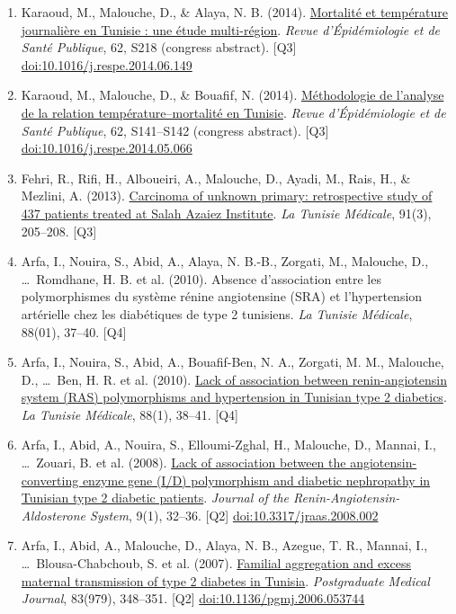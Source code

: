 \documentclass[10pt,a4paper]{article}
\newcommand{\doi}[1]{\href{https://doi.org/#1}{doi:#1}}
\newcommand{\Qu}[1]{[Q#1]}
\begin{document}
\begin{enumerate}[resume*]
\item Karaoud, M., Malouche, D., \& Alaya, N. B. (2014). \href{https://www.em-consulte.com/article/915651/article/mortalite-et-temperature-journaliere-en-tunisie\%C2\%A0-u}{Mortalit\'e et temp\'erature journali\`ere en Tunisie : une \'etude multi-r\'egion}. \emph{Revue d'\'Epid\'emiologie et de Sant\'e Publique}, 62, S218 (congress abstract). \Qu3 \doi{10.1016/j.respe.2014.06.149}
\item Karaoud, M., Malouche, D., \& Bouafif, N. (2014). \href{https://www.em-consulte.com/article/911552/article/methodologie-de-l-analyse-de-la-relation-temperatu}{M\'ethodologie de l'analyse de la relation temp\'erature--mortalit\'e en Tunisie}. \emph{Revue d'\'Epid\'emiologie et de Sant\'e Publique}, 62, S141--S142 (congress abstract). \Qu3 \doi{10.1016/j.respe.2014.05.066}
\item Fehri, R., Rifi, H., Alboueiri, A., Malouche, D., Ayadi, M., Rais, H., \& Mezlini, A. (2013). \href{https://pubmed.ncbi.nlm.nih.gov/23588636/}{Carcinoma of unknown primary: retrospective study of 437 patients treated at Salah Azaiez Institute}. \emph{La Tunisie M\'edicale}, 91(3), 205--208. \Qu3
\item Arfa, I., Nouira, S., Abid, A., Alaya, N. B.-B., Zorgati, M., Malouche, D., \ldots\ Romdhane, H. B. et al. (2010). Absence d'association entre les polymorphismes du syst\`eme r\'enine angiotensine (SRA) et l'hypertension art\'erielle chez les diab\'etiques de type 2 tunisiens. \emph{La Tunisie M\'edicale}, 88(01), 37--40. \Qu4
\item Arfa, I., Nouira, S., Abid, A., Bouafif-Ben, N. A., Zorgati, M. M., Malouche, D., \ldots\ Ben, H. R. et al. (2010). \href{https://pubmed.ncbi.nlm.nih.gov/20415212/}{Lack of association between renin-angiotensin system (RAS) polymorphisms and hypertension in Tunisian type 2 diabetics}. \emph{La Tunisie M\'edicale}, 88(1), 38--41. \Qu4
\item Arfa, I., Abid, A., Nouira, S., Elloumi-Zghal, H., Malouche, D., Mannai, I., \ldots\ Zouari, B. et al. (2008). \href{https://doi.org/10.3317/jraas.2008.002}{Lack of association between the angiotensin-converting enzyme gene (I/D) polymorphism and diabetic nephropathy in Tunisian type 2 diabetic patients}. \emph{Journal of the Renin-Angiotensin-Aldosterone System}, 9(1), 32--36. \Qu2 \doi{10.3317/jraas.2008.002}
\item Arfa, I., Abid, A., Malouche, D., Alaya, N. B., Azegue, T. R., Mannai, I., \ldots\ Blousa-Chabchoub, S. et al. (2007). \href{https://pmc.ncbi.nlm.nih.gov/articles/PMC2600082/}{Familial aggregation and excess maternal transmission of type 2 diabetes in Tunisia}. \emph{Postgraduate Medical Journal}, 83(979), 348--351. \Qu2 \doi{10.1136/pgmj.2006.053744}


\end{enumerate}
\end{document}
